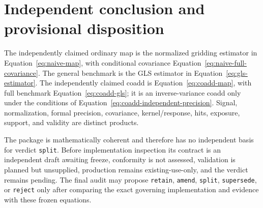 \documentclass[11pt]{article}
\newcommand{\code}[1]{\nolinkurl{#1}}
\begin{document}
\section{Independent conclusion and provisional disposition}

The independently claimed ordinary map is the normalized gridding estimator
in Equation~\eqref{eq:naive-map}, with conditional covariance
Equation~\eqref{eq:naive-full-covariance}. The general benchmark is the GLS
estimator in Equation~\eqref{eq:gls-estimator}. The independently claimed
coadd is Equation~\eqref{eq:coadd-map}, with full benchmark
Equation~\eqref{eq:coadd-gls}; it is an inverse-variance coadd only under the
conditions of Equation~\eqref{eq:coadd-independent-precision}. Signal,
normalization, formal precision, covariance, kernel/response, hits, exposure,
support, and validity are distinct products.

The package is mathematically coherent and therefore has no independent basis
for verdict \code{split}. Before implementation inspection its contract is an
independent draft awaiting freeze, conformity is not assessed, validation is
planned but unsupplied, production remains existing-use-only, and the verdict
remains pending. The final audit may propose \code{retain}, \code{amend},
\code{split}, \code{supersede}, or \code{reject} only after comparing the exact
governing implementation and evidence with these frozen equations.
\end{document}
